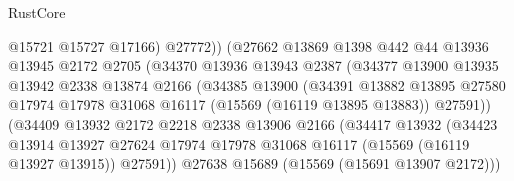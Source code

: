 \begin{lexlean}{RustCore}
\begin{coremodule}
                                    @15721
                                    @15727
                                    @17166)
                                  @27772))
                              (@27662
                                @13869
                                @1398
                                @442
                                @44
                                @13936
                                @13945
                                @2172
                                @2705
                                (@34370
                                  @13936
                                  @13943
                                  @2387
                                  (@34377
                                    @13900
                                    @13935
                                    @13942
                                    @2338
                                    @13874
                                    @2166
                                    (@34385
                                      @13900
                                      (@34391
                                        @13882
                                        @13895
                                        @27580
                                        @17974
                                        @17978
                                        @31068
                                        @16117
                                        (@15569 (@16119 @13895 @13883))
                                        @27591))
                                    (@34409
                                      @13932
                                      @2172
                                      @2218
                                      @2338
                                      @13906
                                      @2166
                                      (@34417
                                        @13932
                                        (@34423
                                          @13914
                                          @13927
                                          @27624
                                          @17974
                                          @17978
                                          @31068
                                          @16117
                                          (@15569 (@16119 @13927 @13915))
                                          @27591))
                                      @27638
                                      @15689
                                      (@15569 (@15691 @13907 @2172)))

\end{coremodule}
\end{lexlean}
